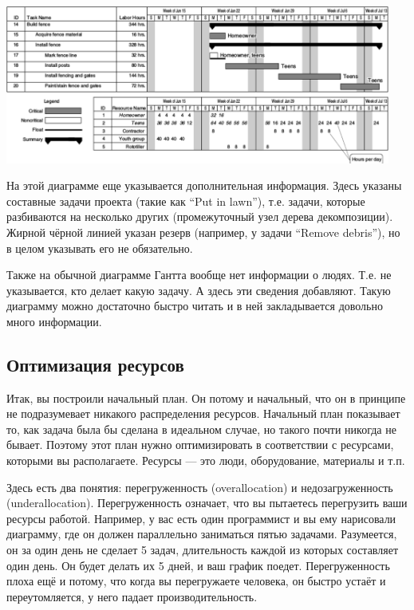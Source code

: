 \documentclass{../../text-style}
\begin{document}
\begin{center}
    \includegraphics[width=0.95\textwidth]{ganttChartResourceUtilization.png}
\end{center}

На этой диаграмме еще указывается дополнительная информация. Здесь указаны составные задачи проекта (такие как \enquote{Put in lawn}), т.е. задачи, которые разбиваются на несколько других (промежуточный узел дерева декомпозиции). Жирной чёрной линией указан резерв (например, у задачи \enquote{Remove debris}), но в целом указывать его не обязательно.

Также на обычной диаграмме Гантта вообще нет информации о людях. Т.е. не указывается, кто делает какую задачу. А здесь эти сведения добавляют. Такую диаграмму можно достаточно быстро читать и в ней закладывается довольно много информации.

\subsection{Оптимизация ресурсов}

Итак, вы построили начальный план. Он потому и начальный, что он в принципе не подразумевает никакого распределения ресурсов. Начальный план показывает то, как задача была бы сделана в идеальном случае, но такого почти никогда не бывает. Поэтому этот план нужно оптимизировать в соответствии с ресурсами, которыми вы располагаете. Ресурсы --- это люди, оборудование, материалы и т.п.

Здесь есть два понятия: перегруженность (overallocation) и недозагруженность (underallocation). Перегруженность означает, что вы пытаетесь перегрузить ваши ресурсы работой. Например, у вас есть один программист и вы ему нарисовали диаграмму, где он должен параллельно заниматься пятью задачами. Разумеется, он за один день не сделает 5 задач, длительность каждой из которых составляет один день. Он будет делать их 5 дней, и ваш график поедет. Перегруженность плоха ещё и потому, что когда вы перегружаете человека, он быстро устаёт и переутомляется, у него падает производительность.
\end{document}
